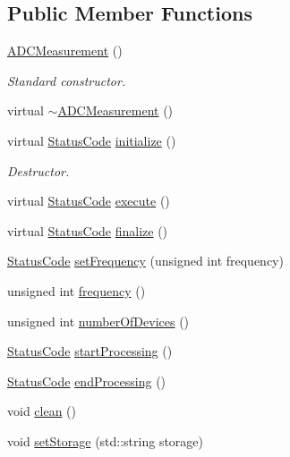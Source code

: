 \subsection*{Public Member Functions}
\begin{DoxyCompactItemize}
\item 
\hyperlink{classADCMeasurement_a93804f658f3aaa78d3ce18199f1bf8e1}{ADCMeasurement} ()
\begin{DoxyCompactList}\small\item\em Standard constructor. \item\end{DoxyCompactList}\item 
virtual \hyperlink{classADCMeasurement_aa89145ed91025783a1bb277cb480ed1c}{$\sim$ADCMeasurement} ()
\item 
virtual \hyperlink{classStatusCode}{StatusCode} \hyperlink{classADCMeasurement_a3fc6d3e863fecc7a1caf91f9b0ca5268}{initialize} ()
\begin{DoxyCompactList}\small\item\em Destructor. \item\end{DoxyCompactList}\item 
virtual \hyperlink{classStatusCode}{StatusCode} \hyperlink{classADCMeasurement_a82de69f0488646dfc50d28f611e2010d}{execute} ()
\item 
virtual \hyperlink{classStatusCode}{StatusCode} \hyperlink{classADCMeasurement_a02a5ae7c0f9c90d0dad00c1d40a1c52a}{finalize} ()
\item 
\hyperlink{classStatusCode}{StatusCode} \hyperlink{classADCMeasurement_a08433e5168f45de1061bf9a17f022f68}{setFrequency} (unsigned int frequency)
\item 
unsigned int \hyperlink{classADCMeasurement_ad3d523331ad64494f2415319a03c638e}{frequency} ()
\item 
unsigned int \hyperlink{classADCMeasurement_a7f91c4feea465de03bd017a005125177}{numberOfDevices} ()
\item 
\hyperlink{classStatusCode}{StatusCode} \hyperlink{classProcessus_a09319bde9bed93e290f69b4e04585543}{startProcessing} ()
\item 
\hyperlink{classStatusCode}{StatusCode} \hyperlink{classProcessus_a5e4da662989d356b89d490b89c7afbfd}{endProcessing} ()
\item 
void \hyperlink{classProcessus_aaeb17673b98d2b39f3aa780e335e0968}{clean} ()
\item 
void \hyperlink{classProcessus_ad57a29b33f9021eda9f6929136f1784f}{setStorage} (std::string storage)

\end{DoxyCompactItemize}

